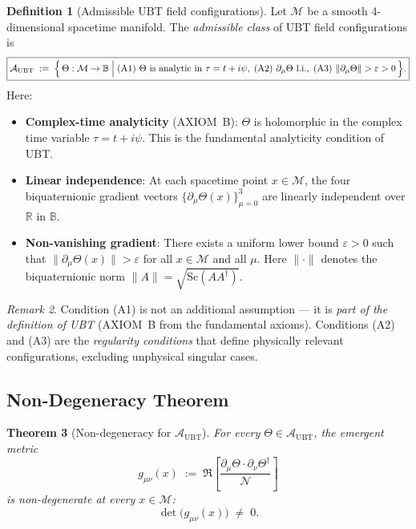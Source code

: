\documentclass[12pt]{article}
\newtheorem{theorem}{Theorem}[section]
\theoremstyle{definition}
\newtheorem{definition}[theorem]{Definition}
\theoremstyle{remark}
\newtheorem{remark}[theorem]{Remark}
\begin{document}
\begin{definition}[Admissible UBT field configurations]
\label{def:admissible}
Let $\mathcal{M}$ be a smooth 4-dimensional spacetime manifold.  The
\emph{admissible class} of UBT field configurations is
\begin{equation}
  \boxed{\mathcal{A}_{\mathrm{UBT}}
  \;:=\;
  \Bigl\{\,
    \Theta : \mathcal{M} \to \mathbb{B}
    \;\Big|\;
    \text{(A1) } \Theta \text{ is analytic in } \tau = t + i\psi,\;
    \text{(A2) } \partial_\mu\Theta \text{ l.i.},\;
    \text{(A3) } \|\partial_\mu\Theta\| > \varepsilon > 0
  \,\Bigr\}.}
  \label{eq:admissible_class}
\end{equation}
Here:
\begin{itemize}
  \item[(A1)] \textbf{Complex-time analyticity} (AXIOM~B): $\Theta$ is holomorphic in the
        complex time variable $\tau = t + i\psi$.  This is the fundamental analyticity
        condition of UBT.
  \item[(A2)] \textbf{Linear independence}: At each spacetime point $x\in\mathcal{M}$,
        the four biquaternionic gradient vectors $\{\partial_\mu\Theta(x)\}_{\mu=0}^3$
        are linearly independent over $\mathbb{R}$ in $\mathbb{B}$.
  \item[(A3)] \textbf{Non-vanishing gradient}: There exists a uniform lower bound
        $\varepsilon > 0$ such that $\|\partial_\mu\Theta(x)\| > \varepsilon$ for all
        $x\in\mathcal{M}$ and all $\mu$.  Here $\|\cdot\|$ denotes the biquaternionic
        norm $\|A\| = \sqrt{\mathrm{Sc}(AA^\dagger)}$.
\end{itemize}
\end{definition}

\begin{remark}
Condition (A1) is not an additional assumption — it is \emph{part of the definition
of UBT} (AXIOM~B from the fundamental axioms).  Conditions (A2) and (A3) are the
\emph{regularity conditions} that define physically relevant configurations,
excluding unphysical singular cases.
\end{remark}

\subsection{Non-Degeneracy Theorem}

\begin{theorem}[Non-degeneracy for $\mathcal{A}_{\mathrm{UBT}}$]
\label{thm:nondeg}
For every $\Theta \in \mathcal{A}_{\mathrm{UBT}}$, the emergent metric
\begin{equation}
  g_{\mu\nu}(x) \;:=\; \Re\!\left[\frac{\partial_\mu\Theta\cdot\partial_\nu\Theta^\dagger}{\mathcal{N}}\right]
\end{equation}
is non-degenerate at every $x\in\mathcal{M}$:
\begin{equation}
  \det\!\bigl(g_{\mu\nu}(x)\bigr) \;\neq\; 0.
\end{equation}
\end{theorem}
\end{document}
